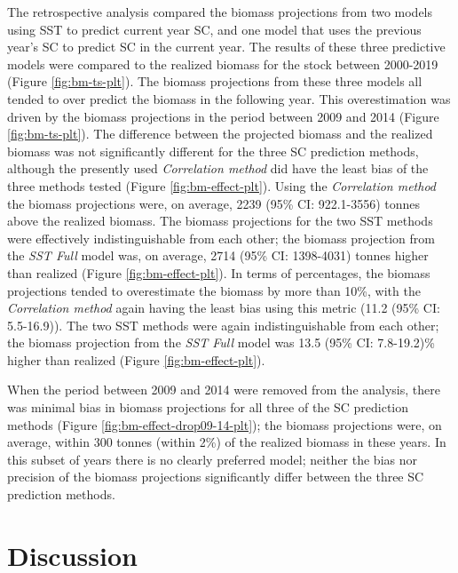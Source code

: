 \documentclass[
]{article}
\begin{document}
The retrospective analysis compared the biomass projections from two models using SST to predict current year SC, and one model that uses the previous year's SC to predict SC in the current year. The results of these three predictive models were compared to the realized biomass for the stock between 2000-2019 (Figure \ref{fig:bm-ts-plt}). The biomass projections from these three models all tended to over predict the biomass in the following year. This overestimation was driven by the biomass projections in the period between 2009 and 2014 (Figure \ref{fig:bm-ts-plt}). The difference between the projected biomass and the realized biomass was not significantly different for the three SC prediction methods, although the presently used \emph{Correlation method} did have the least bias of the three methods tested (Figure \ref{fig:bm-effect-plt}). Using the \emph{Correlation method} the biomass projections were, on average, 2239 (95\% CI: 922.1-3556) tonnes above the realized biomass. The biomass projections for the two SST methods were effectively indistinguishable from each other; the biomass projection from the \emph{SST Full} model was, on average, 2714 (95\% CI: 1398-4031) tonnes higher than realized (Figure \ref{fig:bm-effect-plt}). In terms of percentages, the biomass projections tended to overestimate the biomass by more than 10\%, with the \emph{Correlation method} again having the least bias using this metric (11.2 (95\% CI: 5.5-16.9)). The two SST methods were again indistinguishable from each other; the biomass projection from the \emph{SST Full} model was 13.5 (95\% CI: 7.8-19.2)\% higher than realized (Figure \ref{fig:bm-effect-plt}).

When the period between 2009 and 2014 were removed from the analysis, there was minimal bias in biomass projections for all three of the SC prediction methods (Figure \ref{fig:bm-effect-drop09-14-plt}); the biomass projections were, on average, within 300 tonnes (within 2\%) of the realized biomass in these years. In this subset of years there is no clearly preferred model; neither the bias nor precision of the biomass projections significantly differ between the three SC prediction methods.

\hypertarget{discussion}{%
\section{Discussion}\label{discussion}}
\end{document}
